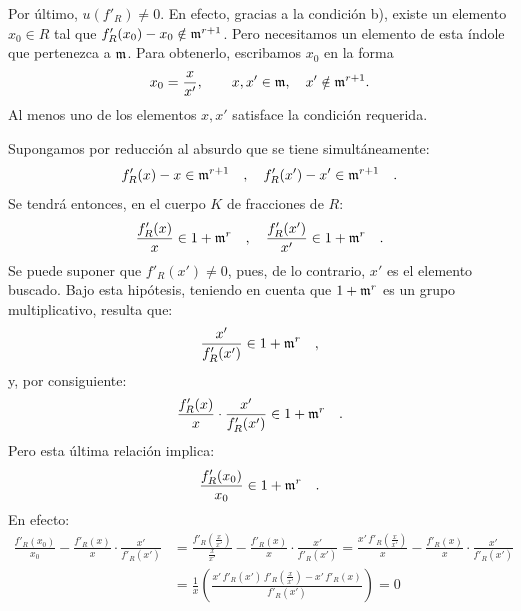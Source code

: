 Por último, $u(f'_R)\ne0$. En efecto, gracias a la condición b), existe un elemento $x_0\in R$ tal que $f'_R(x_0)-x_0\notin\mathfrak m^{r+1}$. Pero necesitamos un elemento de esta índole que pertenezca a $\mathfrak m$. Para obtenerlo, escribamos $x_0$ en la forma
\[
x_0=\frac{x}{x'},\qquad x,x'\in\mathfrak m,\quad x'\notin\mathfrak m^{r+1}.
\]
Al menos uno de los elementos $x,x'$ satisface la condición requerida.

Supongamos por reducción al absurdo que se tiene simultáneamente:
\[
f'_R(x) - x \in \mathfrak m^{r+1} \quad , \quad f'_R(x') - x' \in \mathfrak m^{r+1} \quad .
\]
Se tendrá entonces, en el cuerpo $K$ de fracciones de $R$:
\[
\frac{f'_R(x)}{x} \in 1 + \mathfrak m^r \quad , \quad \frac{f'_R(x')}{x'} \in 1 + \mathfrak m^r \quad .
\]
Se puede suponer que $f'_R(x') \neq 0$, pues, de lo contrario, $x'$ es el elemento buscado. Bajo esta hipótesis, teniendo en cuenta que $1 + \mathfrak m^r$ es un grupo multiplicativo, resulta que:
\[
\frac{x'}{f'_R(x')} \in 1 + \mathfrak m^r \quad ,
\]
y, por consiguiente:
\[
\frac{f'_R(x)}{x} \cdot \frac{x'}{f'_R(x')} \in 1 + \mathfrak m^r \quad .
\]
Pero esta última relación implica:
\[
\frac{f'_R(x_0)}{x_0} \in 1 + \mathfrak m^r \quad .
\]
En efecto:
\[
\begin{aligned}
\frac{f'_R(x_0)}{x_0} - \frac{f'_R(x)}{x} \cdot \frac{x'}{f'_R(x')}
&= \frac{f'_R(\frac{x}{x'})}{\frac{x}{x'}} - \frac{f'_R(x)}{x} \cdot \frac{x'}{f'_R(x')}
= \frac{x'\,f'_R(\frac{x}{x'})}{x} - \frac{f'_R(x)}{x} \cdot \frac{x'}{f'_R(x')} \\
&= \frac{1}{x}\left(\frac{x'\,f'_R(x')\,f'_R(\frac{x}{x'}) - x'\,f'_R(x)}{f'_R(x')}\right) = 0
\end{aligned}
\]
